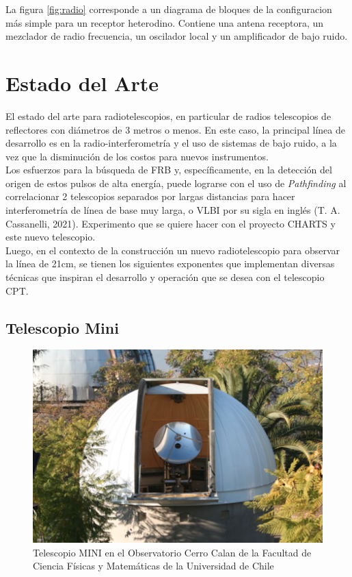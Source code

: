 La figura \ref{fig:radio} corresponde a un diagrama de bloques de la configuracion más simple para un receptor heterodino. Contiene una antena receptora, un mezclador de radio frecuencia, un oscilador local y un amplificador de bajo ruido.

\section{Estado del Arte}

El estado del arte para radiotelescopios, en particular de radios telescopios de reflectores con diámetros de 3 metros o menos. En este caso, la principal línea de desarrollo es en la radio-interferometría y el uso de sistemas de bajo ruido, a la vez que la disminución de los costos para nuevos instrumentos.\\

Los esfuerzos para la búsqueda de FRB y, específicamente, en la detección del origen de estos pulsos de alta energía, puede lograrse con el uso de \textit{Pathfinding} al correlacionar 2 telescopios separados por largas distancias para hacer interferometría de línea de base muy larga, o VLBI por su sigla en inglés (T. A. Cassanelli, 2021). Experimento que se quiere hacer con el proyecto CHARTS y este nuevo telescopio.\\

Luego, en el contexto de la construcción un nuevo radiotelescopio para observar la línea de 21cm, se tienen los siguientes exponentes que implementan diversas técnicas que inspiran el desarrollo y operación que se desea con el telescopio CPT.\\


\subsection{Telescopio Mini}

\begin{figure}
    \centering
    \includegraphics[width = 12cm]{img/mini.png}
    \caption{Telescopio MINI en el Observatorio Cerro Calan de la Facultad de Ciencia Físicas y Matemáticas de la Universidad de Chile\cite{DAS2024}}
    \label{fig:mini}
\end{figure}


